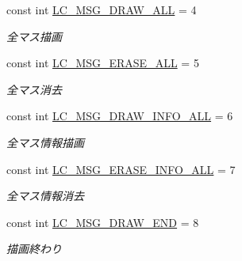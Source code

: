 \begin{DoxyCompactItemize}
const int \hyperlink{class_reversi_wpf_1_1_reversi_const_a1bec6d43ab42c6a5ce06daa01f4e6275}{L\+C\+\_\+\+M\+S\+G\+\_\+\+D\+R\+A\+W\+\_\+\+A\+LL} = 4
\begin{DoxyCompactList}\small\item\em 全マス描画 \end{DoxyCompactList}\item 
\mbox{\label{class_reversi_wpf_1_1_reversi_const_a87cdcb9de6a5fc28b5645b833cef5c59}} 
const int \hyperlink{class_reversi_wpf_1_1_reversi_const_a87cdcb9de6a5fc28b5645b833cef5c59}{L\+C\+\_\+\+M\+S\+G\+\_\+\+E\+R\+A\+S\+E\+\_\+\+A\+LL} = 5
\begin{DoxyCompactList}\small\item\em 全マス消去 \end{DoxyCompactList}\item 
\mbox{\label{class_reversi_wpf_1_1_reversi_const_a7b610b067a6c71f26c1801223410e378}} 
const int \hyperlink{class_reversi_wpf_1_1_reversi_const_a7b610b067a6c71f26c1801223410e378}{L\+C\+\_\+\+M\+S\+G\+\_\+\+D\+R\+A\+W\+\_\+\+I\+N\+F\+O\+\_\+\+A\+LL} = 6
\begin{DoxyCompactList}\small\item\em 全マス情報描画 \end{DoxyCompactList}\item 
\mbox{\label{class_reversi_wpf_1_1_reversi_const_aabbf8dbebebf7c07280e8afd5129a24b}} 
const int \hyperlink{class_reversi_wpf_1_1_reversi_const_aabbf8dbebebf7c07280e8afd5129a24b}{L\+C\+\_\+\+M\+S\+G\+\_\+\+E\+R\+A\+S\+E\+\_\+\+I\+N\+F\+O\+\_\+\+A\+LL} = 7
\begin{DoxyCompactList}\small\item\em 全マス情報消去 \end{DoxyCompactList}\item 
\mbox{\label{class_reversi_wpf_1_1_reversi_const_ad300d04bf46e98ba54cedd5025b1acf2}} 
const int \hyperlink{class_reversi_wpf_1_1_reversi_const_ad300d04bf46e98ba54cedd5025b1acf2}{L\+C\+\_\+\+M\+S\+G\+\_\+\+D\+R\+A\+W\+\_\+\+E\+ND} = 8
\begin{DoxyCompactList}\small\item\em 描画終わり \end{DoxyCompactList}\item 

\end{DoxyCompactItemize}
